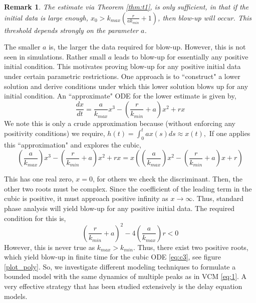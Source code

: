 \documentclass[sn-mathphys-num]{sn-jnl}
\newtheorem{remark}{Remark}
\numberwithin{equation}{section}
\numberwithin{equation}{section}
\begin{document}
\begin{remark}
The estimate via Theorem \ref{thm:t1}, is only sufficient, in that if the initial data is large enough, $x_{0} > k_{max}\left( \frac{r}{a k_{min}}  + 1 \right) $, then blow-up will occur. This threshold depends strongly on the parameter $a$. 
\end{remark}

The smaller $a$ is, the larger the data required for blow-up. However, this is not seen in simulations. Rather small $a$ leads to blow-up for essentially any positive initial condition. This motivates proving blow-up for any positive initial data under certain parametric restrictions. One approach is to ``construct" a lower solution and derive conditions under which this lower solution blows up for any initial condition. An ``approximate" ODE for the lower estimate is given by,
\begin{equation}
\frac{dx}{dt} = \frac{a}{k_{max}}x^{3} - \left( \frac{r}{k_{min}}  + a \right) x^2 + rx
\end{equation}
We note this is only a crude approximation because (without enforcing any positivity conditions) we require,
$ h(t) = \int^{t}_{0}a x(s)ds \approx x(t),
$
If one applies this ``approximation" and explores the cubic,
\begin{equation}
\label{eq:c3}
\left(  \frac{a}{k_{max}}\right)x^{3} - \left( \frac{r}{ k_{min}}  + a \right) x^2 + rx = x \left(  \left( \frac{a}{k_{max}}\right)x^{2} - \left( \frac{r}{ k_{min}}  + a \right) x + r \right)
\end{equation}

This has one real zero, $x=0$, for others we check the discriminant. 
Then, the other two roots must be complex. Since the coefficient of the leading term in the cubic is positive, it must approach positive infinity as $x \rightarrow \infty$. Thus, standard phase analysis will yield blow-up for any positive initial data. The required condition for this is,
\begin{equation}
\left( \frac{r}{ k_{min}}  + a \right) ^{2} - 4 \left(\frac{a}{k_{max}}\right) r < 0
\end{equation}
However, this is never true as $k_{max} > k_{min}$. Thus, there exist two positive roots, which yield blow-up in finite time for the cubic ODE \eqref{eq:c3}, see figure \eqref{plot_poly}. So, we investigate different modeling techniques to formulate a bounded model with the same dynamics of multiple peaks as in VCM \eqref{eq:1}. A very effective strategy that has been studied extensively is the delay equation models.
\end{document}
